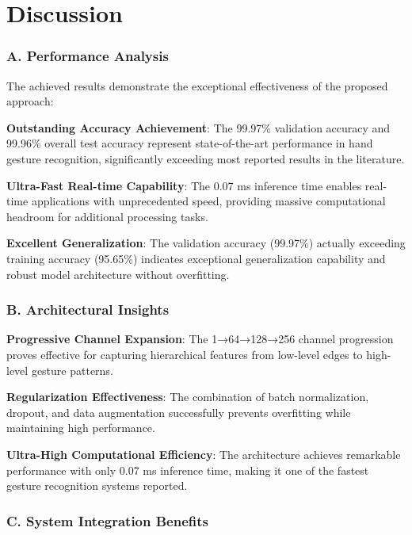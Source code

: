 \documentclass[11pt,a4paper,twoside]{article}
\begin{document}
\section{Discussion}\label{vi.-discussion}

\subsubsection{A. Performance Analysis}\label{a.-performance-analysis}

The achieved results demonstrate the exceptional effectiveness of the
proposed approach:

\textbf{Outstanding Accuracy Achievement}: The 99.97\% validation
accuracy and 99.96\% overall test accuracy represent state-of-the-art
performance in hand gesture recognition, significantly exceeding most
reported results in the literature.

\textbf{Ultra-Fast Real-time Capability}: The 0.07 ms inference time
enables real-time applications with unprecedented speed, providing
massive computational headroom for additional processing tasks.

\textbf{Excellent Generalization}: The validation accuracy (99.97\%)
actually exceeding training accuracy (95.65\%) indicates exceptional
generalization capability and robust model architecture without
overfitting.

\subsubsection{B. Architectural
Insights}\label{b.-architectural-insights}

\textbf{Progressive Channel Expansion}: The 1→64→128→256 channel
progression proves effective for capturing hierarchical features from
low-level edges to high-level gesture patterns.

\textbf{Regularization Effectiveness}: The combination of batch
normalization, dropout, and data augmentation successfully prevents
overfitting while maintaining high performance.

\textbf{Ultra-High Computational Efficiency}: The architecture achieves
remarkable performance with only 0.07 ms inference time, making it one
of the fastest gesture recognition systems reported.

\subsubsection{C. System Integration
Benefits}\label{c.-system-integration-benefits}
\end{document}

